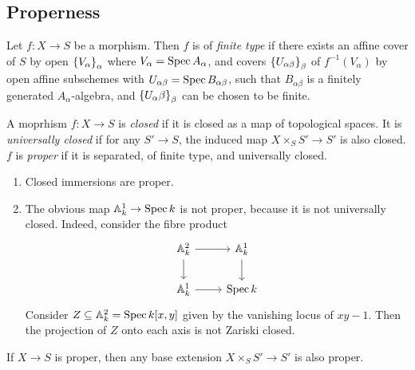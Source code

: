 \subsection{Properness}
\begin{definition}
    Let \( f : X \to S \) be a morphism.
    Then \( f \) is of \emph{finite type} if there exists an affine cover of \( S \) by open \( \qty{V_\alpha}_\alpha \) where \( V_\alpha = \operatorname{Spec} A_\alpha \), and covers \( \qty{U_{\alpha\beta}}_\beta \) of \( f^{-1}(V_\alpha) \) by open affine subschemes with \( U_{\alpha\beta} = \operatorname{Spec} B_{\alpha\beta} \), such that \( B_{\alpha\beta} \) is a finitely generated \( A_\alpha \)-algebra, and \( \qty{U_\alpha\beta}_{\beta} \) can be chosen to be finite.
\end{definition}
\begin{definition}
    A moprhism \( f : X \to S \) is \emph{closed} if it is closed as a map of topological spaces.
    It is \emph{universally closed} if for any \( S' \to S \), the induced map \( X \times_S S' \to S' \) is also closed.
    \( f \) is \emph{proper} if it is separated, of finite type, and universally closed.
\end{definition}
\begin{example}
    \begin{enumerate}
        \item Closed immersions are proper.
        \item The obvious map \( \mathbb A^1_k \to \operatorname{Spec} k \) is not proper, because it is not universally closed.
        Indeed, consider the fibre product
\[\begin{tikzcd}
	{\mathbb A^2_k} & {\mathbb A^1_k} \\
	{\mathbb A^1_k} & {\Spec k}
	\arrow[from=1-1, to=1-2]
	\arrow[from=1-2, to=2-2]
	\arrow[from=1-1, to=2-1]
	\arrow[from=2-1, to=2-2]
\end{tikzcd}\]
        Consider \( Z \subseteq \mathbb A^2_k = \operatorname{Spec} k[x,y] \) given by the vanishing locus of \( xy - 1 \).
        Then the projection of \( Z \) onto each axis is not Zariski closed.
    \end{enumerate}
\end{example}
\begin{remark}
	If \( X \to S \) is proper, then any base extension \( X \times_S S' \to S' \) is also proper.
\end{remark}
